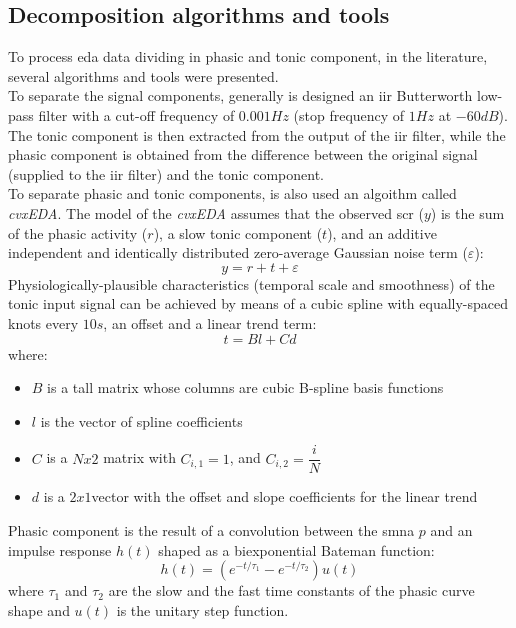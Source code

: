 \subsection{Decomposition algorithms and tools}
To process \gls{eda} data dividing in phasic and tonic component, in the literature, several algorithms and tools were presented.
\\ \indent
To separate the signal components, generally is designed an \gls{iir} Butterworth low-pass filter with a cut-off frequency of $0.001Hz$ (stop frequency of $1Hz$ at $-60dB$). The tonic component is then extracted from the output of the \gls{iir} filter, while the phasic component is obtained from the difference between the original signal (supplied to the \gls{iir} filter) and the tonic component.
\\ \indent
To separate phasic and tonic components, is also used an algoithm called \textit{cvxEDA}. The model of the \textit{cvxEDA} assumes that the observed \gls{scr} ($y$) is the sum of the phasic activity ($r$), a slow tonic component ($t$), and an additive independent and identically distributed zero-average Gaussian noise term ($\varepsilon$):
\begin{equation}
	y=r+t+\varepsilon
\end{equation}
Physiologically-plausible characteristics (temporal scale and smoothness) of the tonic input signal can be achieved by means of a cubic spline with equally-spaced knots every $10s$, an offset and a linear trend term:
\begin{equation}
	\label{eq:tonic_model}
	t=Bl+Cd
\end{equation}
where:
\begin{itemize}
	\item $B$ is a tall matrix whose columns are cubic B-spline basis functions
	\item $l$ is the vector of spline coefficients
	\item $C$ is a $Nx2$ matrix with $C_{i,1} = 1$, and $C_{i,2} = \dfrac{i}{N}$
	\item $d$ is a $2x1$vector with the offset and slope coefficients for the linear trend
\end{itemize}
Phasic component is the result of a convolution between the \gls{smna} $p$ and an impulse response $h(t)$ shaped as a biexponential Bateman function:
\begin{equation}
	h(t)=(e^{-t/\tau_1}-e^{-t/\tau_2})u(t)
\end{equation}
where $\tau_1$ and $\tau_2$ are the slow and the fast time constants of the phasic curve shape and $u(t)$ is the unitary step function.
